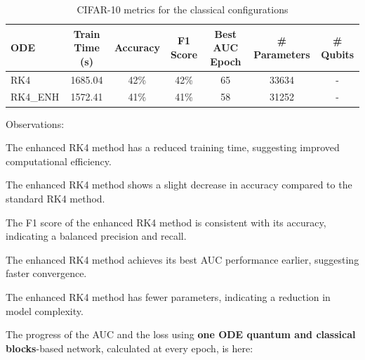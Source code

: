\documentclass[12pt,a4paper]{report}
\begin{document}
\clearpage

\begin{table}[th]\small\linespread{1}
  \label{tab:classical_CIFAR_2}
  \centering
  \begin{tabular}{|l|c|c|c|c|c|c|}
    \hline
    \textbf{ODE} & \textbf{Train Time (s)} & \textbf{Accuracy} & \textbf{F1 Score} & \textbf{Best AUC Epoch} & \textbf{\# Parameters} & \textbf{\# Qubits} \\
    \hline
    RK4          & 1685.04                 & 42\%              & 42\%              & 65                      & 33634                  & -                  \\
    RK4\_ENH     & 1572.41                 & 41\%              & 41\%              & 58                      & 31252                  & -                  \\
    \hline
  \end{tabular}
  \caption{CIFAR-10 metrics for the classical configurations}
\end{table}

Observations:

The enhanced RK4 method has a reduced training time, suggesting improved computational efficiency.

The enhanced RK4 method shows a slight decrease in accuracy compared to the standard RK4 method.

The F1 score of the enhanced RK4 method is consistent with its accuracy, indicating a balanced precision and recall.

The enhanced RK4 method achieves its best AUC performance earlier, suggesting faster convergence.

The enhanced RK4 method has fewer parameters, indicating a reduction in model complexity.

\clearpage
The progress of the AUC and the loss using \textbf{one ODE quantum and classical blocks}-based network, calculated at every epoch, is here:
\end{document}
